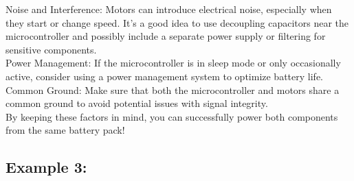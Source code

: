 \noindent Noise and Interference: Motors can introduce electrical noise, especially when they start or change speed. It’s a good idea to use decoupling capacitors near the microcontroller and possibly include a separate power supply or filtering for sensitive components.\\

\noindent Power Management: If the microcontroller is in sleep mode or only occasionally active, consider using a power management system to optimize battery life.\\

\noindent Common Ground: Make sure that both the microcontroller and motors share a common ground to avoid potential issues with signal integrity.\\

\noindent By keeping these factors in mind, you can successfully power both components from the same battery pack!
\subsection{Example 3: }